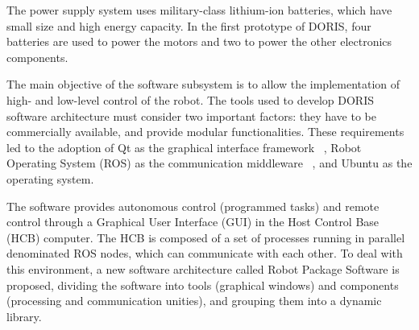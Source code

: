 \documentclass{ifacconf}
\begin{document}
The power supply system uses military-class lithium-ion batteries, which have
small size and high energy capacity. In the first prototype of DORIS, four
batteries are used to power the motors and two to power the other electronics
components. 


The main objective of the software subsystem is to allow the implementation of
high- and low-level control of the robot. The tools used to develop DORIS
software architecture must consider two important factors: they have to be
commercially available, and provide modular functionalities. These requirements
led to the adoption of Qt as the graphical interface framework ~\cite{qt},
Robot Operating System (ROS) as the communication middleware ~\cite{ros}, and
Ubuntu as the operating system.


The software provides autonomous control (programmed tasks) and remote control
through a Graphical User Interface (GUI) in the Host Control Base (HCB)
computer. The HCB is composed of a set of processes running in parallel
denominated ROS nodes, which can communicate with each other. To deal with this
environment, a new software architecture called Robot Package Software is
proposed, dividing the software into tools (graphical windows) and components
(processing and communication unities), and grouping them into a dynamic
library. %

\end{document}

